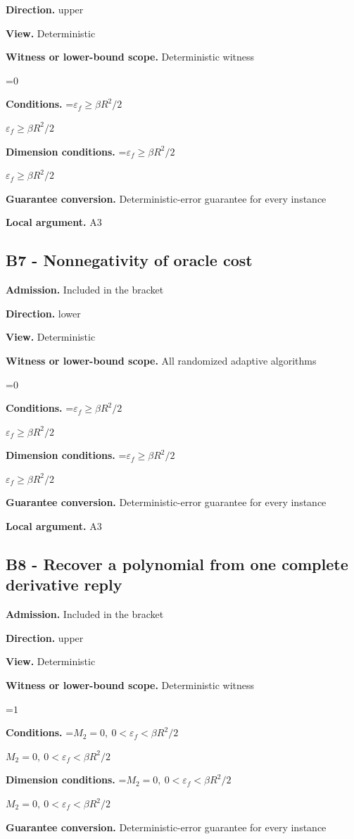 \documentclass[10pt,a4paper]{article}
\newcommand{\AtlasMath}[1]{\par\begingroup\centering\setbox0=\hbox{$\displaystyle #1$}\ifdim\wd0>1.4\linewidth\typeout{ATLAS WIDE FORMULA: \the\wd0}\fi\ifdim\wd0>\linewidth\resizebox{\linewidth}{!}{\box0}\else\box0\fi\par\endgroup}
\newcommand{\AtlasInlineMath}[1]{\begingroup\setbox0=\hbox{$#1$}\ifdim\wd0>.4\linewidth\endgroup\AtlasMath{#1}\else\endgroup$#1$\fi}
\begin{document}
\textbf{Direction.} upper

\textbf{View.} Deterministic

\textbf{Witness or lower-bound scope.} Deterministic witness

\AtlasMath{0}
\textbf{Conditions.} \AtlasInlineMath{\varepsilon_f\ge\beta R^2/2}

\textbf{Dimension conditions.} \AtlasInlineMath{\varepsilon_f\ge\beta R^2/2}

\textbf{Guarantee conversion.} Deterministic-error guarantee for every instance

\textbf{Local argument.} A3

\subsection{B7 - Nonnegativity of oracle cost}
\textbf{Admission.} Included in the bracket

\textbf{Direction.} lower

\textbf{View.} Deterministic

\textbf{Witness or lower-bound scope.} All randomized adaptive algorithms

\AtlasMath{0}
\textbf{Conditions.} \AtlasInlineMath{\varepsilon_f\ge\beta R^2/2}

\textbf{Dimension conditions.} \AtlasInlineMath{\varepsilon_f\ge\beta R^2/2}

\textbf{Guarantee conversion.} Deterministic-error guarantee for every instance

\textbf{Local argument.} A3

\subsection{B8 - Recover a polynomial from one complete derivative reply}
\textbf{Admission.} Included in the bracket

\textbf{Direction.} upper

\textbf{View.} Deterministic

\textbf{Witness or lower-bound scope.} Deterministic witness

\AtlasMath{1}
\textbf{Conditions.} \AtlasInlineMath{M_2=0,\ 0<\varepsilon_f<\beta R^2/2}

\textbf{Dimension conditions.} \AtlasInlineMath{M_2=0,\ 0<\varepsilon_f<\beta R^2/2}

\textbf{Guarantee conversion.} Deterministic-error guarantee for every instance
\end{document}
